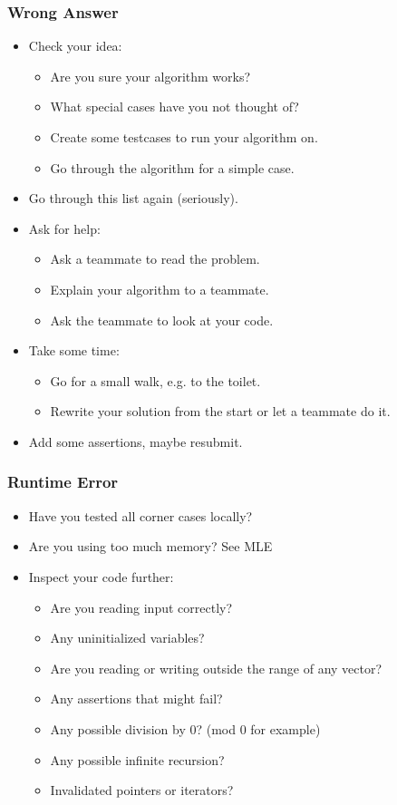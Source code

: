 \subsubsection{Wrong Answer}
\begin{itemize}
	\item Check your idea:
	\begin{itemize}
		\item Are you sure your algorithm works?
		\item What special cases have you not thought of?
		\item Create some testcases to run your algorithm on.
		\item Go through the algorithm for a simple case.
	\end{itemize}
	\item Go through this list again (seriously).
	\item Ask for help:
	\begin{itemize}
		\item Ask a teammate to read the problem.
		\item Explain your algorithm to a teammate.
		\item Ask the teammate to look at your code.
	\end{itemize}
	\item Take some time:
	\begin{itemize}
		\item Go for a small walk, e.g. to the toilet.
		\item Rewrite your solution from the start or let a teammate do it.
	\end{itemize}
	\item Add some assertions, maybe resubmit.
\end{itemize}

\subsubsection{Runtime Error}
\begin{itemize}
	\item Have you tested all corner cases locally?
	\item Are you using too much memory? See MLE
	\item Inspect your code further:
	\begin{itemize}
		\item Are you reading input correctly?
		\item Any uninitialized variables?
		\item Are you reading or writing outside the range of any vector?
		\item Any assertions that might fail?
		\item Any possible division by 0? (mod 0 for example)
		\item Any possible infinite recursion?
		\item Invalidated pointers or iterators?
	\end{itemize}
\end{itemize}


